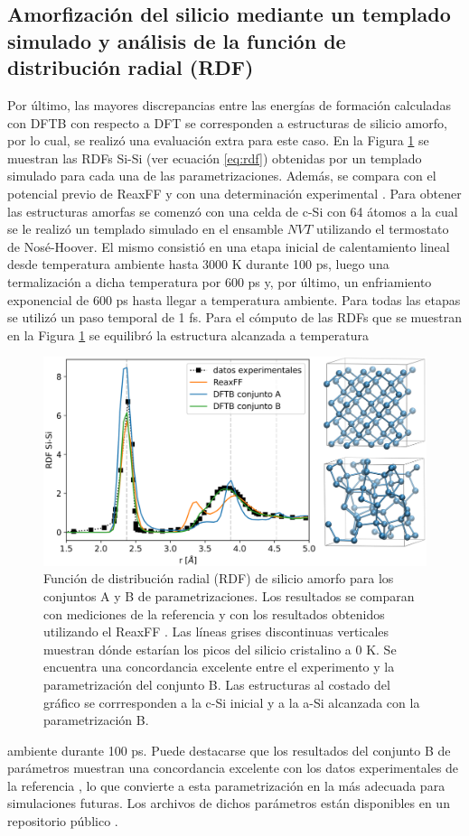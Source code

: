 \subsection{Amorfización del silicio mediante un templado simulado y análisis de la función de distribución radial (RDF)}\label{s:rdfb}

Por último, las mayores discrepancias entre las energías de formación calculadas con DFTB
con respecto a DFT se corresponden a estructuras de silicio amorfo, por lo cual,
se realizó una evaluación extra para este caso. En la Figura \ref{fig:rdfb} se 
muestran las RDFs Si-Si (ver ecuación \ref{eq:rdf}) obtenidas por un templado simulado para cada una de las
parametrizaciones. Además, se compara con el potencial previo de ReaxFF 
\cite{fan2013} y con una determinación experimental \cite{laaziri1999}. Para 
obtener las estructuras amorfas se comenzó con una celda de c-Si con 64 átomos 
a la cual se le realizó un templado simulado en el ensamble $NVT$ utilizando el 
termostato de Nosé-Hoover. El mismo consistió en una etapa inicial de 
calentamiento lineal desde temperatura ambiente hasta 3000 K durante 100 ps, luego una
termalización a dicha temperatura por 600 ps y, por último, un enfriamiento 
exponencial de 600 ps hasta llegar a temperatura ambiente. Para todas las etapas
se utilizó un paso temporal de 1 fs. Para el cómputo de las RDFs que se muestran
en la Figura \ref{fig:rdfb} se equilibró la estructura alcanzada a temperatura 
\begin{figure}[h!]
    \centering
    \includegraphics[width=.7\textwidth]{Silicio/modelo/resultados/rdf/rdf.png}
    \caption{Función de distribución radial (RDF) de silicio amorfo para los
    conjuntos A y B de parametrizaciones. Los resultados se comparan con 
    mediciones de la referencia \cite{laaziri1999} y con los resultados obtenidos
    utilizando el ReaxFF \cite{fan2013}. Las líneas grises discontinuas verticales
    muestran dónde estarían los picos del silicio cristalino a 0 K. Se encuentra 
    una concordancia excelente entre el experimento y la parametrización del 
    conjunto B. Las estructuras al costado del gráfico se corrresponden a la 
    c-Si inicial y a la a-Si alcanzada con la parametrización B.}
    \label{fig:rdfb}
\end{figure}
ambiente durante 100 ps. Puede destacarse que los resultados del conjunto B de parámetros muestran
una concordancia excelente con los datos experimentales de la referencia 
\cite{laaziri1999}, lo que convierte a esta parametrización en la más adecuada
para simulaciones futuras. Los archivos de dichos parámetros están disponibles
en un repositorio público \cite{dftb_lisi}.
